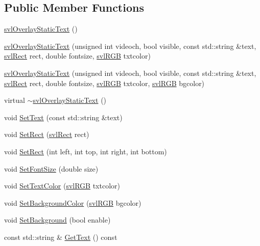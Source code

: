 \subsection*{Public Member Functions}
\begin{DoxyCompactItemize}
\item 
\hyperlink{classsvl_overlay_static_text_add1b84facba4a2e4d8ef8a72adb0d3bd}{svl\+Overlay\+Static\+Text} ()
\item 
\hyperlink{classsvl_overlay_static_text_a1ad30d815d82d5e9d2215ea204d53fae}{svl\+Overlay\+Static\+Text} (unsigned int videoch, bool visible, const std\+::string \&text, \hyperlink{structsvl_rect}{svl\+Rect} rect, double fontsize, \hyperlink{structsvl_r_g_b}{svl\+R\+G\+B} txtcolor)
\item 
\hyperlink{classsvl_overlay_static_text_ae59e96433c724a398cb3a65d761f1852}{svl\+Overlay\+Static\+Text} (unsigned int videoch, bool visible, const std\+::string \&text, \hyperlink{structsvl_rect}{svl\+Rect} rect, double fontsize, \hyperlink{structsvl_r_g_b}{svl\+R\+G\+B} txtcolor, \hyperlink{structsvl_r_g_b}{svl\+R\+G\+B} bgcolor)
\item 
virtual \hyperlink{classsvl_overlay_static_text_a7db0f0c7ff835089e36c2bb5181629a8}{$\sim$svl\+Overlay\+Static\+Text} ()
\item 
void \hyperlink{classsvl_overlay_static_text_ad9a57e18f9156dd090be05f19ec7d1c9}{Set\+Text} (const std\+::string \&text)
\item 
void \hyperlink{classsvl_overlay_static_text_a8ef0f5a31bc6cfd828b70ced9fdd0b53}{Set\+Rect} (\hyperlink{structsvl_rect}{svl\+Rect} rect)
\item 
void \hyperlink{classsvl_overlay_static_text_add60db89ab9ffc98dd552082b9d96cba}{Set\+Rect} (int left, int top, int right, int bottom)
\item 
void \hyperlink{classsvl_overlay_static_text_a9f6b55144f19e566e4eca8a87ef3cca3}{Set\+Font\+Size} (double size)
\item 
void \hyperlink{classsvl_overlay_static_text_a403d1378964e3f0a6fab29fdd5f5b010}{Set\+Text\+Color} (\hyperlink{structsvl_r_g_b}{svl\+R\+G\+B} txtcolor)
\item 
void \hyperlink{classsvl_overlay_static_text_a6e3134b7dbd29c1dd0c6c95bcadbf6e7}{Set\+Background\+Color} (\hyperlink{structsvl_r_g_b}{svl\+R\+G\+B} bgcolor)
\item 
void \hyperlink{classsvl_overlay_static_text_af63f66c4606e25d33776b5eb18a3c3a3}{Set\+Background} (bool enable)
\item 
const std\+::string \& \hyperlink{classsvl_overlay_static_text_aa9ef3b410eacad29cf0fa0b0d2d11080}{Get\+Text} () const 

\end{DoxyCompactItemize}
